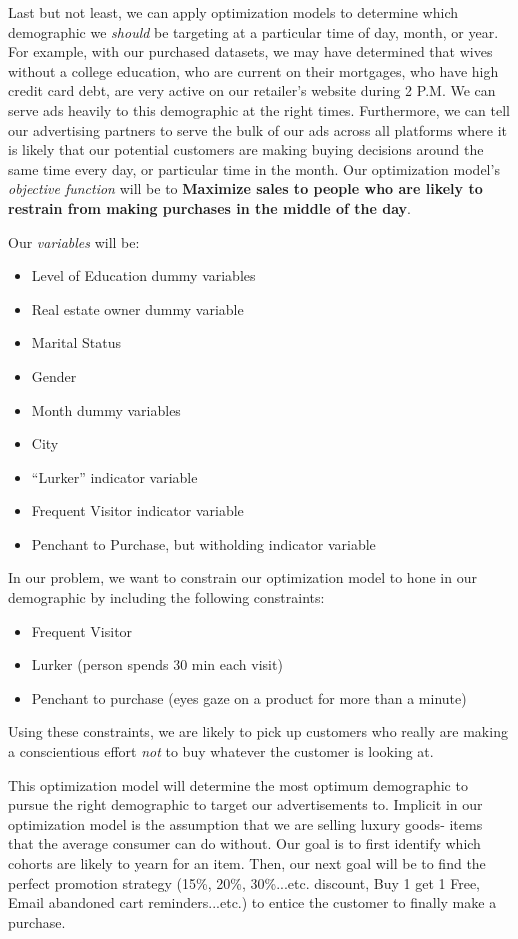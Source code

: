 \documentclass[letterpaper,12pt]{article}
\begin{document}
Last but not least, we can apply optimization models to determine which demographic we \emph{should} be targeting at a particular time of day, month, or year.  For example, with our purchased datasets, we may have determined that wives without a college education, who are current on their mortgages, who have high credit card debt, are very active on our retailer's website during 2 P.M.  We can serve ads heavily to this demographic at the right times.  Furthermore, we can tell our advertising partners to serve the bulk of our ads across all platforms where it is likely that our potential customers are making buying decisions around the same time every day, or particular time in the month.  Our optimization model's \emph{objective function} will be to \textbf{Maximize sales to people who are likely to restrain from making purchases in the middle of the day}.  

Our \emph{variables} will be:

\begin{itemize}
\item Level of Education dummy variables
\item Real estate owner dummy variable
\item Marital Status
\item Gender
\item Month dummy variables
\item City
\item ``Lurker'' indicator variable
\item Frequent Visitor indicator variable
  \item Penchant to Purchase, but witholding indicator variable
\end{itemize}

In our problem, we want to constrain our optimization model to hone in our demographic by including the following constraints:

\begin{itemize}
\item Frequent Visitor
\item Lurker (person spends 30 min each visit)
\item Penchant to purchase (eyes gaze on a product for more than a minute)
\end{itemize}

Using these constraints, we are likely to pick up customers who really are making a conscientious effort \emph{not} to buy whatever the customer is looking at.  
    

This optimization model will determine the most optimum demographic to pursue the right demographic to target our advertisements to.  Implicit in our optimization model is the assumption that we are selling luxury goods- items that the average consumer can do without.  Our goal is to first identify which cohorts are likely to yearn for an item.  Then, our next goal will be to find the perfect promotion strategy (15\%, 20\%, 30\%...etc. discount, Buy 1 get 1 Free, Email abandoned cart reminders...etc.) to entice the customer to finally make a purchase. 
       
\end{document}
